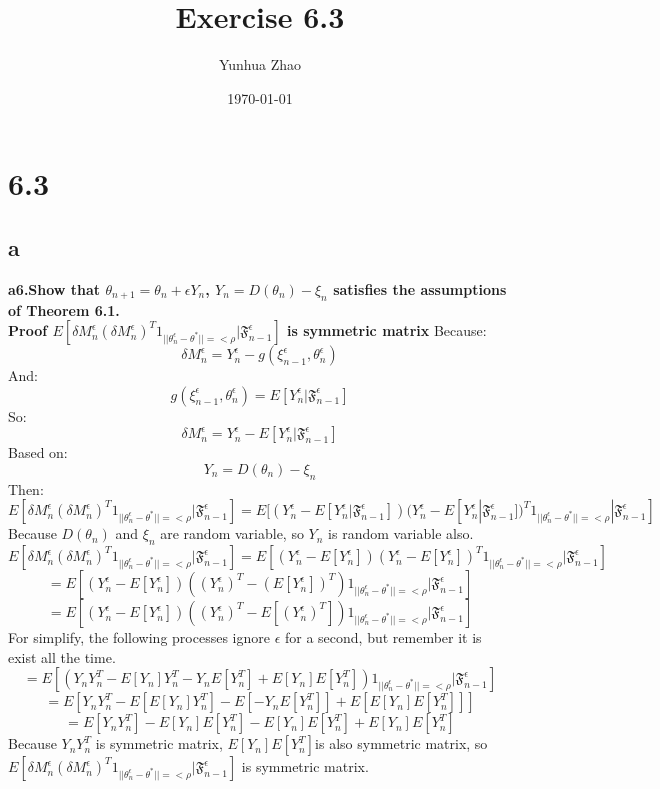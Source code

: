 \documentclass{article}
\title{Exercise 6.3}
\author{Yunhua Zhao}
\date{\today}
\begin{document}
\maketitle

\section{6.3}
\subsection{a}
\textbf{a6.Show that $ \theta_{n+1}=\theta_n+\epsilon Y_n $, $ Y_n=D(\theta_n)-\xi_n $ satisfies the assumptions of Theorem 6.1.}  \\
\textbf{Proof $E[\delta M_n^\epsilon(\delta M_n^\epsilon)^T1_{{||\theta_n^\epsilon-\theta^*||=<\rho}}|\mathfrak{F}_{n-1}^\epsilon]$ is symmetric matrix}
Because:
$$ \delta M_n^\epsilon=Y_n^\epsilon-g(\xi_{n-1}^\epsilon,\theta_n^\epsilon) $$
And:
$$ g(\xi_{n-1}^\epsilon,\theta_n^\epsilon)=E[Y_n^\epsilon|\mathfrak{F}_{n-1}^\epsilon] $$
So:
$$ \delta M_n^\epsilon=Y_n^\epsilon-E[Y_n^\epsilon|\mathfrak{F}_{n-1}^\epsilon] $$
Based on:
$$ Y_n=D(\theta_n)-\xi_n $$
Then:
$$ E[\delta M_n^\epsilon(\delta M_n^\epsilon)^T1_{{||\theta_n^\epsilon-\theta^*||=<\rho}}|\mathfrak{F}_{n-1}^\epsilon] = E[(Y_n^\epsilon-E[Y_n^\epsilon|\mathfrak{F}_{n-1}^\epsilon]) (Y_n^\epsilon-E[Y_n^\epsilon|\mathfrak{F}_{n-1}^\epsilon])^T1_{{||\theta_n^\epsilon-\theta^*||=<\rho}}|\mathfrak{F}_{n-1}^\epsilon] $$
Because $D(\theta_n)$ and $\xi_n$ are random variable, so $Y_n$ is random variable also.
$$ E[\delta M_n^\epsilon(\delta M_n^\epsilon)^T1_{{||\theta_n^\epsilon-\theta^*||=<\rho}}|\mathfrak{F}_{n-1}^\epsilon] = E[(Y_n^\epsilon-E[Y_n^\epsilon]) (Y_n^\epsilon-E[Y_n^\epsilon])^T1_{{||\theta_n^\epsilon-\theta^*||=<\rho}}|\mathfrak{F}_{n-1}^\epsilon] $$
$$ = E[(Y_n^\epsilon-E[Y_n^\epsilon])((Y_n^\epsilon)^T-(E[Y_n^\epsilon])^T)1_{{||\theta_n^\epsilon-\theta^*||=<\rho}}|\mathfrak{F}_{n-1}^\epsilon] $$
$$ = E[(Y_n^\epsilon-E[Y_n^\epsilon])((Y_n^\epsilon)^T-E[(Y_n^\epsilon)^T])1_{{||\theta_n^\epsilon-\theta^*||=<\rho}}|\mathfrak{F}_{n-1}^\epsilon] $$
For simplify, the following processes ignore $\epsilon$ for a second, but remember it is exist all the time.  
$$ = E[(Y_nY_n^T-E[Y_n]Y_n^T-Y_nE[Y_n^T]+E[Y_n]E[Y_n^T])1_{{||\theta_n^\epsilon-\theta^*||=<\rho}}|\mathfrak{F}_{n-1}^\epsilon] $$
$$ = E[Y_nY_n^T-E[E[Y_n]Y_n^T]-E[-Y_nE[Y_n^T]]+E[E[Y_n]E[Y_n^T]]] $$
$$ = E[Y_nY_n^T]-E[Y_n]E[Y_n^T]-E[Y_n]E[Y_n^T]+E[Y_n]E[Y_n^T] $$
Because $ Y_nY_n^T $ is symmetric matrix, $ E[Y_n]E[Y_n^T] $is also symmetric matrix, so $E[\delta M_n^\epsilon(\delta M_n^\epsilon)^T1_{{||\theta_n^\epsilon-\theta^*||=<\rho}}|\mathfrak{F}_{n-1}^\epsilon]$ is symmetric matrix.  \\
\end{document}
